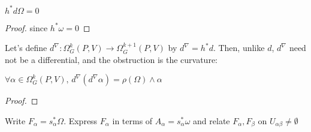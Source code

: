 \documentclass{article}
\begin{document}
\begin{corollary}
$h^\ast d\Omega = 0$
\end{corollary}
\begin{proof}
since $h^\ast \omega = 0$
\end{proof}
Let's define $d^\nabla : \Omega^k_G(P,V) \to \Omega^{k+1}_G(P,V)$ by $d^\nabla = h^\ast d$. Then, unlike $d$, $d^\nabla$ need not be a differential, and the obstruction is the curvature:

\begin{prop}
$\forall \alpha \in \Omega_G^k(P,V), \, d^\nabla(d^\nabla \alpha) = \rho(\Omega) \wedge \alpha$
\end{prop}
\begin{proof}
\end{proof}

\begin{ex}
Write $F_\alpha = s_\alpha^\ast \Omega$. Express $F_\alpha$ in terms of $A_\alpha = s_\alpha^\ast \omega$ and relate $F_\alpha, F_\beta$ on $U_{\alpha\beta} \neq \emptyset $
\end{ex}

\end{document}
